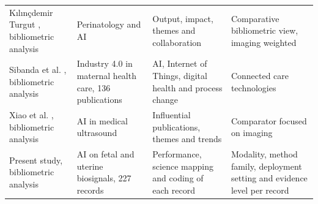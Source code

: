 \begin{table}[!t]
\begin{tabularx}{\textwidth}{@{}L{3.9cm}L{4.4cm}L{4.6cm}Y@{}}
Kılınçdemir Turgut \cite{kilinc2025}, bibliometric analysis & Perinatology and AI & Output, impact, themes and collaboration & Comparative bibliometric view, imaging weighted \\
Sibanda et al. \cite{sibanda2024}, bibliometric analysis & Industry 4.0 in maternal health care, 136 publications & AI, Internet of Things, digital health and process change & Connected care technologies \\
Xiao et al. \cite{xiao2024}, bibliometric analysis & AI in medical ultrasound & Influential publications, themes and trends & Comparator focused on imaging \\
Present study, bibliometric analysis & AI on fetal and uterine biosignals, 227 records & Performance, science mapping and coding of each record & Modality, method family, deployment setting and evidence level per record \\
\bottomrule
\end{tabularx}
\end{table}
